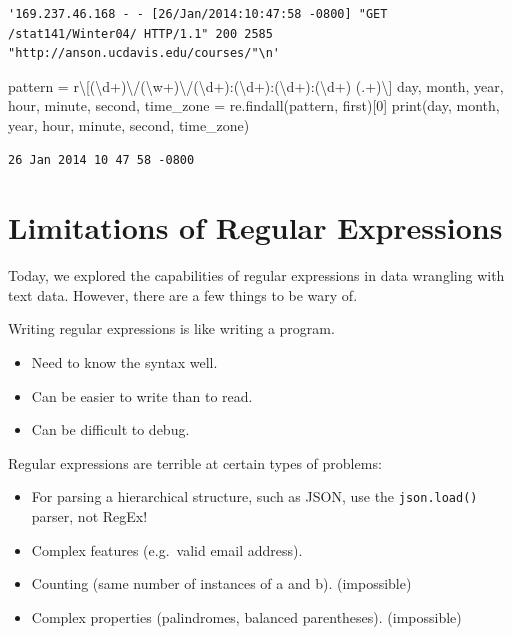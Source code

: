 \documentclass[
  letterpaper,
  DIV=11,
  numbers=noendperiod]{scrreprt}
\newenvironment{Shaded}{\begin{snugshade}}{\end{snugshade}}
\newcommand{\BuiltInTok}[1]{\textcolor[rgb]{0.00,0.23,0.31}{#1}}
\newcommand{\DecValTok}[1]{\textcolor[rgb]{0.68,0.00,0.00}{#1}}
\newcommand{\NormalTok}[1]{\textcolor[rgb]{0.00,0.23,0.31}{#1}}
\newcommand{\OperatorTok}[1]{\textcolor[rgb]{0.37,0.37,0.37}{#1}}
\newcommand{\VerbatimStringTok}[1]{\textcolor[rgb]{0.13,0.47,0.30}{#1}}
\providecommand{\tightlist}{%
  \setlength{\itemsep}{0pt}\setlength{\parskip}{0pt}}\usepackage{longtable,booktabs,array}
\begin{document}
\begin{verbatim}
'169.237.46.168 - - [26/Jan/2014:10:47:58 -0800] "GET /stat141/Winter04/ HTTP/1.1" 200 2585 "http://anson.ucdavis.edu/courses/"\n'
\end{verbatim}

\begin{Shaded}
\begin{Highlighting}[]
\NormalTok{pattern }\OperatorTok{=} \VerbatimStringTok{r\textquotesingle{}\textbackslash{}[(\textbackslash{}d+)\textbackslash{}/(\textbackslash{}w+)\textbackslash{}/(\textbackslash{}d+):(\textbackslash{}d+):(\textbackslash{}d+):(\textbackslash{}d+) (.+)\textbackslash{}]\textquotesingle{}}
\NormalTok{day, month, year, hour, minute, second, time\_zone }\OperatorTok{=}\NormalTok{ re.findall(pattern, first)[}\DecValTok{0}\NormalTok{]}
\BuiltInTok{print}\NormalTok{(day, month, year, hour, minute, second, time\_zone)}
\end{Highlighting}
\end{Shaded}

\begin{verbatim}
26 Jan 2014 10 47 58 -0800
\end{verbatim}

\section{Limitations of Regular
Expressions}\label{limitations-of-regular-expressions}

Today, we explored the capabilities of regular expressions in data
wrangling with text data. However, there are a few things to be wary of.

Writing regular expressions is like writing a program.

\begin{itemize}
\tightlist
\item
  Need to know the syntax well.
\item
  Can be easier to write than to read.
\item
  Can be difficult to debug.
\end{itemize}

Regular expressions are terrible at certain types of problems:

\begin{itemize}
\tightlist
\item
  For parsing a hierarchical structure, such as JSON, use the
  \texttt{json.load()} parser, not RegEx!
\item
  Complex features (e.g.~valid email address).
\item
  Counting (same number of instances of a and b). (impossible)
\item
  Complex properties (palindromes, balanced parentheses). (impossible)
\end{itemize}
\end{document}
